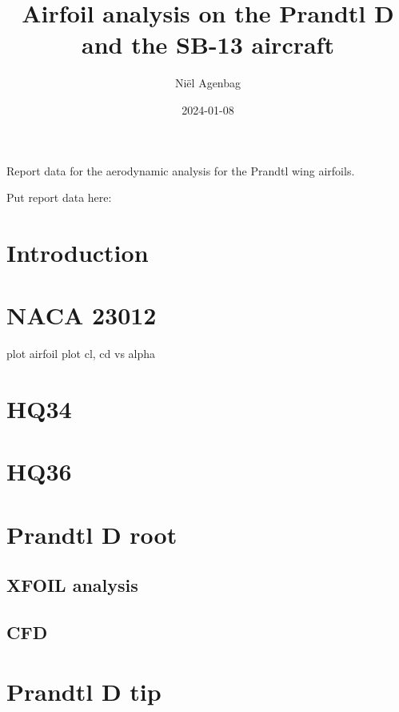 \documentclass{article}
\title{Airfoil analysis on the Prandtl D and the SB-13 aircraft}
\author{Ni\"el Agenbag}
\date{2024-01-08}
\begin{document}
\maketitle

Report data for the aerodynamic analysis for the Prandtl wing airfoils.

Put report data here:

\section{Introduction}


\section{NACA 23012}

plot airfoil
plot cl, cd vs alpha

\section{HQ34}
\section{HQ36}


\section{Prandtl D root}

\subsection{XFOIL analysis}

\subsection{CFD}

\section{Prandtl D tip}
\end{document}
